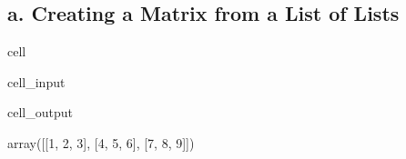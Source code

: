 \documentclass[letterpaper,10pt,english]{jupyterBook}
\begin{document}
\subsection{a. Creating a Matrix from a List of Lists}
\label{\detokenize{lessons/Intro_to_Matrices_in_NumPy:a-creating-a-matrix-from-a-list-of-lists}}
\begin{sphinxuseclass}{cell}\begin{sphinxVerbatimInput}

\begin{sphinxuseclass}{cell_input}
\begin{sphinxVerbatim}[commandchars=\\\{\}]
  \PYG{p}{[}\PYG{p}{[}  \PYG{p}{]} 
                   \PYG{p}{[}  \PYG{p}{]} 
                   \PYG{p}{[}  \PYG{p}{]}\PYG{p}{]}
\end{sphinxVerbatim}

\end{sphinxuseclass}\end{sphinxVerbatimInput}
\begin{sphinxVerbatimOutput}

\begin{sphinxuseclass}{cell_output}
\begin{sphinxVerbatim}[commandchars=\\\{\}]
array([[1, 2, 3],
       [4, 5, 6],
       [7, 8, 9]])
\end{sphinxVerbatim}

\end{sphinxuseclass}\end{sphinxVerbatimOutput}

\end{sphinxuseclass}
\end{document}
